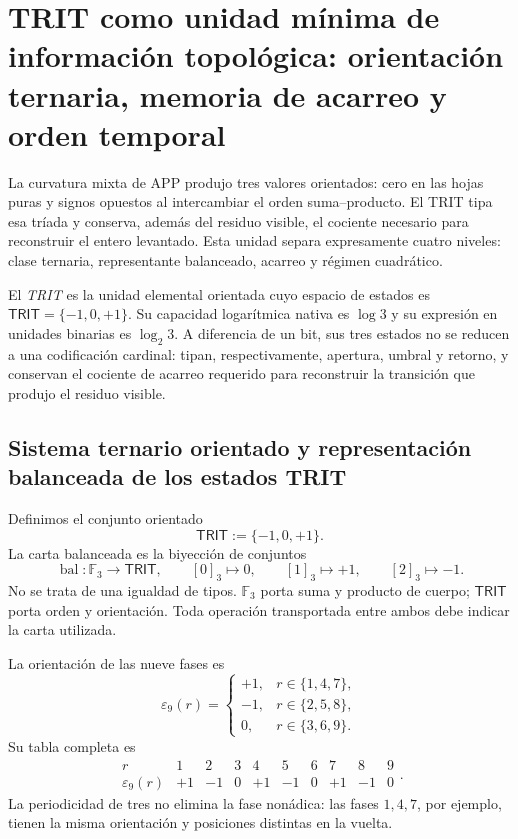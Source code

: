 
\section{TRIT como unidad mínima de información topológica: orientación ternaria, memoria de acarreo y orden temporal}
\label{p12-83-c1-s11:chap:trit-levantado-regimenes}

La curvatura mixta de APP produjo tres valores orientados: cero en las hojas
puras y signos opuestos al intercambiar el orden suma--producto. El TRIT
tipa esa tríada y conserva, además del residuo visible, el cociente necesario
para reconstruir el entero levantado. Esta unidad separa expresamente cuatro
niveles: clase ternaria, representante balanceado, acarreo y régimen
cuadrático.

\begin{definition}
El \emph{TRIT} es la unidad elemental orientada cuyo espacio de estados es
\(\mathsf{TRIT}=\{-1,0,+1\}\). Su capacidad logarítmica nativa es
\(\log 3\) y su expresión en unidades binarias es \(\log_2 3\). A diferencia
de un bit, sus tres estados no se reducen a una codificación cardinal: tipan,
respectivamente, apertura, umbral y retorno, y conservan el cociente de
acarreo requerido para reconstruir la transición que produjo el residuo
visible.
\end{definition}

\subsection{Sistema ternario orientado y representación balanceada de los estados TRIT}

Definimos el conjunto orientado
\[
 \mathsf{TRIT}:=\{-1,0,+1\}.
\]
La carta balanceada es la biyección de conjuntos
\[
 \operatorname{bal}:\mathbb F_3\longrightarrow\mathsf{TRIT},
 \qquad
 [0]_3\mapsto0,\qquad[1]_3\mapsto+1,\qquad[2]_3\mapsto-1.
\]
No se trata de una igualdad de tipos. \(\mathbb F_3\) porta suma y producto
de cuerpo; \(\mathsf{TRIT}\) porta orden y orientación. Toda operación
transportada entre ambos debe indicar la carta utilizada.

La orientación de las nueve fases es
\[
 \varepsilon_9(r)=
 \begin{cases}
 +1,&r\in\{1,4,7\},\\
 -1,&r\in\{2,5,8\},\\
 0,&r\in\{3,6,9\}.
 \end{cases}
\]
Su tabla completa es
\[
\begin{array}{c|ccccccccc}
r&1&2&3&4&5&6&7&8&9\\\hline
\varepsilon_9(r)&+1&-1&0&+1&-1&0&+1&-1&0
\end{array}.
\]
La periodicidad de tres no elimina la fase nonádica: las fases
\(1,4,7\), por ejemplo, tienen la misma orientación y posiciones distintas
en la vuelta.

